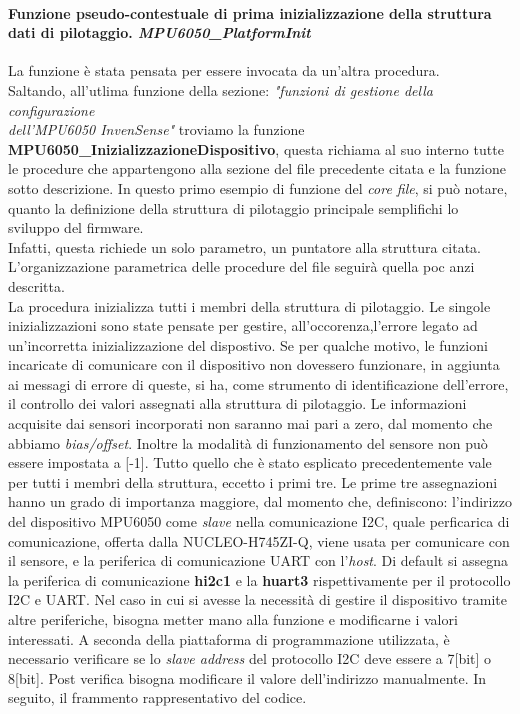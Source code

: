 \documentclass[11pt]{report}
\begin{document}
\paragraph{Funzione pseudo-contestuale di prima inizializzazione della struttura dati di pilotaggio. \textit{MPU6050\_PlatformInit}}
La funzione è stata pensata per essere invocata da un'altra procedura.\\
Saltando, all'utlima funzione della sezione: \textit{"funzioni di gestione della configurazione\\dell'MPU6050 InvenSense"} troviamo la funzione
\textbf{MPU6050\_InizializzazioneDispositivo}, questa richiama al suo interno tutte le procedure che appartengono alla sezione del file precedente citata e la funzione sotto descrizione.
In questo primo esempio di funzione del \textit{core file}, si può notare, quanto la definizione della struttura di pilotaggio principale semplifichi lo sviluppo del firmware.\\
Infatti, questa richiede un solo parametro, un puntatore alla struttura citata.\\ 
L'organizzazione parametrica delle procedure del file seguirà quella poc anzi descritta.\\
La procedura inizializza tutti i membri della struttura di pilotaggio. Le singole inizializzazioni sono state pensate per gestire, all'occorenza,l'errore legato ad un'incorretta inizializzazione del dispostivo. 
Se per qualche motivo, le funzioni incaricate di comunicare con il dispositivo non dovessero funzionare, in aggiunta ai messagi di errore di queste, si ha, come strumento di identificazione dell'errore, il controllo dei valori 
assegnati alla struttura di pilotaggio. Le informazioni acquisite dai sensori incorporati non saranno mai pari a zero, dal momento che abbiamo \textit{bias/offset}. Inoltre la modalità di funzionamento del sensore non può essere impostata a [-1].
Tutto quello che è stato esplicato precedentemente vale per tutti i membri della struttura, eccetto i primi tre. Le prime tre assegnazioni hanno un grado di importanza maggiore, dal momento che, definiscono: l'indirizzo del dispositivo MPU6050 come \textit{slave} nella comunicazione I2C, quale perficarica di comunicazione, offerta dalla NUCLEO-H745ZI-Q, viene usata per comunicare con il sensore, e la periferica di comunicazione UART con l'\textit{host}.
Di default si assegna la periferica di comunicazione \textbf{hi2c1} e la \textbf{huart3} rispettivamente per il protocollo I2C e UART. Nel caso in cui si avesse la necessità di gestire il dispositivo tramite altre periferiche, bisogna metter mano alla funzione e modificarne i valori interessati.
A seconda della piattaforma di programmazione utilizzata, è necessario verificare se lo \textit{slave address} del protocollo I2C deve essere a 7[bit] o 8[bit]. Post verifica bisogna modificare il valore dell'indirizzo manualmente. 
In seguito, il frammento rappresentativo del codice.

\end{document}
